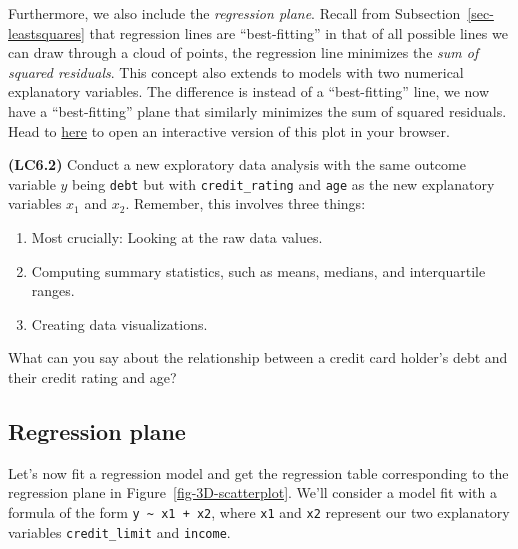 \documentclass[
  letterpaper,
  DIV=11,
  numbers=noendperiod]{scrreprt}
\providecommand{\tightlist}{%
  \setlength{\itemsep}{0pt}\setlength{\parskip}{0pt}}\usepackage{longtable,booktabs,array}
\theoremstyle{definition}
\theoremstyle{remark}
\begin{document}
Furthermore, we also include the \emph{regression
plane}. Recall from
Subsection~\ref{sec-leastsquares} that regression lines are
``best-fitting'' in that of all possible lines we can draw through a
cloud of points, the regression line minimizes the \emph{sum of squared
residuals}. This concept also extends to
models with two numerical explanatory variables. The difference is
instead of a ``best-fitting'' line, we now have a ``best-fitting'' plane
that similarly minimizes the sum of squared residuals. Head to
\href{https://beta.rstudioconnect.com/connect/\#/apps/3214/}{here} to
open an interactive version of this plot in your browser.

\begin{tcolorbox}[enhanced jigsaw, colback=white, toprule=.15mm, bottomrule=.15mm, titlerule=0mm, title={{🎯} Learning Check 6.1}, leftrule=.75mm, arc=.35mm, left=2mm, colframe=quarto-callout-tip-color-frame, coltitle=black, opacitybacktitle=0.6, bottomtitle=1mm, colbacktitle=quarto-callout-tip-color!10!white, opacityback=0, toptitle=1mm, rightrule=.15mm, breakable]

\textbf{(LC6.2)} Conduct a new exploratory data analysis with the same
outcome variable \(y\) being \texttt{debt} but with
\texttt{credit\_rating} and \texttt{age} as the new explanatory
variables \(x_1\) and \(x_2\). Remember, this involves three things:

\begin{enumerate}
\def\labelenumi{\arabic{enumi}.}
\tightlist
\item
  Most crucially: Looking at the raw data values.
\item
  Computing summary statistics, such as means, medians, and
  interquartile ranges.
\item
  Creating data visualizations.
\end{enumerate}

What can you say about the relationship between a credit card holder's
debt and their credit rating and age?

\end{tcolorbox}

\hypertarget{sec-model3table}{%
\subsection{Regression plane}\label{sec-model3table}}

Let's now fit a regression model and get the regression table
corresponding to the regression plane in
Figure~\ref{fig-3D-scatterplot}. We'll consider a model fit with a
formula of the form \texttt{y\ \textasciitilde{}\ x1\ +\ x2}, where
\texttt{x1} and \texttt{x2} represent our two explanatory variables
\texttt{credit\_limit} and \texttt{income}.
\end{document}
